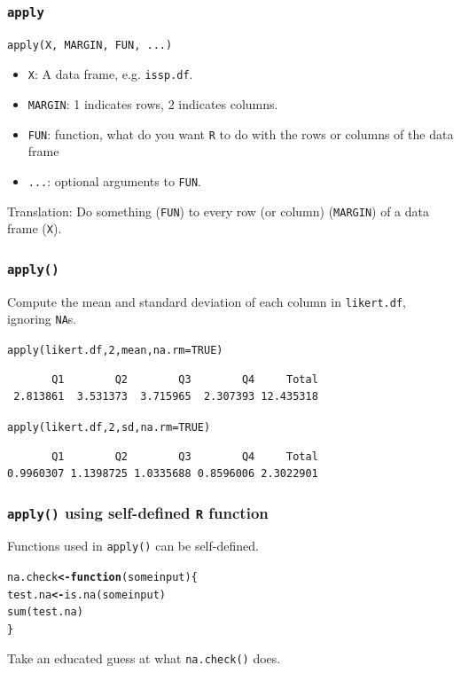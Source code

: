 \documentclass{beamer}\usepackage[]{graphicx}\usepackage[]{color}
\makeatletter
\newcommand{\hlnum}[1]{\textcolor[rgb]{0.533,0,0.133}{#1}}%
\newcommand{\hlstd}[1]{\textcolor[rgb]{0,0,0}{#1}}%
\newcommand{\hlkwa}[1]{\textcolor[rgb]{0.4,0.067,0.067}{\textbf{#1}}}%
\newcommand{\hlkwb}[1]{\textcolor[rgb]{0,0,0.4}{\textbf{#1}}}%
\newcommand{\hlkwc}[1]{\textcolor[rgb]{0,0,0.4}{#1}}%
\newcommand{\hlkwd}[1]{\textcolor[rgb]{0,0.267,0.4}{#1}}%
\newenvironment{kframe}{%
 \def\at@end@of@kframe{}%
 \ifinner\ifhmode%
  \def\at@end@of@kframe{\end{minipage}}%
  \begin{minipage}{\columnwidth}%
 \fi\fi%
 \def\FrameCommand##1{\hskip\@totalleftmargin \hskip-\fboxsep
 \colorbox{shadecolor}{##1}\hskip-\fboxsep
     \hskip-\linewidth \hskip-\@totalleftmargin \hskip\columnwidth}%
 \MakeFramed {\advance\hsize-\width
   \@totalleftmargin\z@ \linewidth\hsize
   \@setminipage}}%
 {\par\unskip\endMakeFramed%
 \at@end@of@kframe}
\newenvironment{knitrout}{}{} %
\makeatother
\begin{document}
\begin{frame}[fragile]
  \frametitle{\texttt{apply}}
\begin{verbatim}
apply(X, MARGIN, FUN, ...)
\end{verbatim}
  \begin{itemize}
  \item \texttt{X}: A data frame, e.g. \texttt{issp.df}.
  \item \texttt{MARGIN}: 1 indicates rows, 2 indicates columns.
  \item \texttt{FUN}: function, what do you want \texttt{R} to do with
    the rows or columns of the data frame
  \item \texttt{...}: optional arguments to \texttt{FUN}.
  \end{itemize}
Translation: Do something (\texttt{FUN}) to every row (or column) (\texttt{MARGIN}) of a data
frame (\texttt{X}). 
\end{frame}


\begin{frame}[fragile]
\frametitle{\texttt{apply()}}
Compute the mean and standard deviation of each column in \texttt{likert.df}, ignoring \texttt{NA}s.
\begin{knitrout}
\color{fgcolor}\begin{kframe}
\begin{alltt}
\hlkwd{apply}\hlstd{(likert.df,} \hlnum{2}\hlstd{, mean,} \hlkwc{na.rm} \hlstd{=} \hlnum{TRUE}\hlstd{)}
\end{alltt}
\begin{verbatim}
       Q1        Q2        Q3        Q4     Total 
 2.813861  3.531373  3.715965  2.307393 12.435318 
\end{verbatim}
\begin{alltt}
\hlkwd{apply}\hlstd{(likert.df,} \hlnum{2}\hlstd{, sd,} \hlkwc{na.rm} \hlstd{=} \hlnum{TRUE}\hlstd{)}
\end{alltt}
\begin{verbatim}
       Q1        Q2        Q3        Q4     Total 
0.9960307 1.1398725 1.0335688 0.8596006 2.3022901 
\end{verbatim}
\end{kframe}
\end{knitrout}
\end{frame}  

\begin{frame}[fragile]
\frametitle{\texttt{apply()} using self-defined \texttt{R} function}
Functions used in \texttt{apply()} can be self-defined.
\begin{knitrout}
\color{fgcolor}\begin{kframe}
\begin{alltt}
\hlstd{na.check} \hlkwb{<-} \hlkwa{function}\hlstd{(}\hlkwc{someinput}\hlstd{)\{}
 \hlstd{test.na} \hlkwb{<-} \hlkwd{is.na}\hlstd{(someinput)}
 \hlkwd{sum}\hlstd{(test.na)}
\hlstd{\}}
\end{alltt}
\end{kframe}
\end{knitrout}
Take an educated guess at what \texttt{na.check()} does.
\end{frame}  
\end{document}
